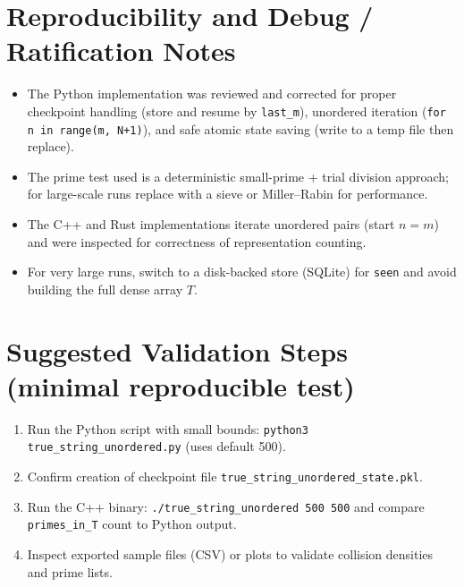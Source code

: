\documentclass[12pt]{article}
\theoremstyle{definition}
\theoremstyle{plain}
\begin{document}
\section{Reproducibility and Debug / Ratification Notes}
\begin{itemize}
  \item The Python implementation was reviewed and corrected for proper checkpoint handling (store and resume by \texttt{last\_m}), unordered iteration (\texttt{for n in range(m, N+1)}), and safe atomic state saving (write to a temp file then replace).
  \item The prime test used is a deterministic small-prime + trial division approach; for large-scale runs replace with a sieve or Miller--Rabin for performance.
  \item The C++ and Rust implementations iterate unordered pairs (start \(n=m\)) and were inspected for correctness of representation counting.
  \item For very large runs, switch to a disk-backed store (SQLite) for \texttt{seen} and avoid building the full dense array \(T\).
\end{itemize}

\section{Suggested Validation Steps (minimal reproducible test)}
\begin{enumerate}
  \item Run the Python script with small bounds: \texttt{python3 true\_string\_unordered.py} (uses default 500).
  \item Confirm creation of checkpoint file \texttt{true\_string\_unordered\_state.pkl}.
  \item Run the C++ binary: \texttt{./true\_string\_unordered 500 500} and compare \texttt{primes\_in\_T} count to Python output.
  \item Inspect exported sample files (CSV) or plots to validate collision densities and prime lists.
\end{enumerate}
\end{document}

